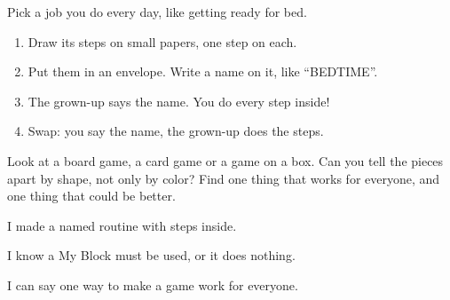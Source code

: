 
\begin{playathome}
Pick a job you do every day, like getting ready for bed.
\begin{enumerate}[leftmargin=1.4em,itemsep=2pt]
  \item Draw its steps on small papers, one step on each.
  \item Put them in an envelope. Write a name on it, like \enquote{BEDTIME}.
  \item The grown-up says the name. You do every step inside!
  \item Swap: you say the name, the grown-up does the steps.
\end{enumerate}
\end{playathome}

\begin{playathome}
Look at a board game, a card game or a game on a box. Can you tell the pieces apart by shape, not only by color? Find one thing that works for everyone, and one thing that could be better.
\end{playathome}

\begin{selfcheck}
  \item I made a named routine with steps inside.
  \item I know a My Block must be used, or it does nothing.
  \item I can say one way to make a game work for everyone.
\end{selfcheck}
